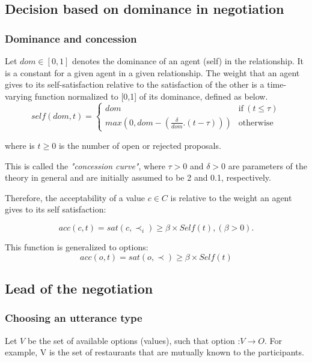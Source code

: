\documentclass{llncs}
\begin{document}
	\subsection{Decision based on dominance in negotiation}
	\label{decision}
	\subsubsection {Dominance and concession}
	Let  $dom \in [0, 1] $ denotes the dominance of an agent (self) in the relationship.  It is a constant for a given agent in a given relationship.
	The weight that an agent gives to its self-satisfaction relative to	the satisfaction of the other is a time-varying function normalized to 	[0,1] of its dominance, defined as below.
	\begin{equation}
	self(dom, t) = \left\{\begin{array}{ll}
	dom & \mathrm{if\ } (t \leq \tau)\\
	max(0, dom - (\frac{\delta}{dom} . (t - \tau))) & \mathrm{otherwise}
	\end{array}\right.
	\end{equation}
	
	
	where is $t \geq 0$ is the number of open or rejected proposals.
	
	This is called the \emph{"concession curve"}, where $\tau > 0$ and $\delta > 0$
	are parameters of the theory in general and are initially assumed to
	be 2 and 0.1, respectively.
	
	Therefore, the acceptability of a value $c \in C$  is relative to the weight an agent gives to its self satisfaction:
	
	\begin{equation}
	acc(c, t) = sat(c, \prec_i) \geq  \beta \times Self(t) ,  (\beta >0).
	\end{equation}
	
	This function is generalized to options:
	\begin{equation}
	acc(o, t) = sat(o, \prec) \geq  \beta \times Self(t)
	\end{equation}
	
	
	
	\subsection{Lead of the negotiation}
	

	\subsubsection{Choosing an utterance type}
	Let $V$ be the set of available options (values), such that option :$ V\rightarrow O$. For example, V is the set of restaurants that are mutually known to the participants. 
	
\end{document}
